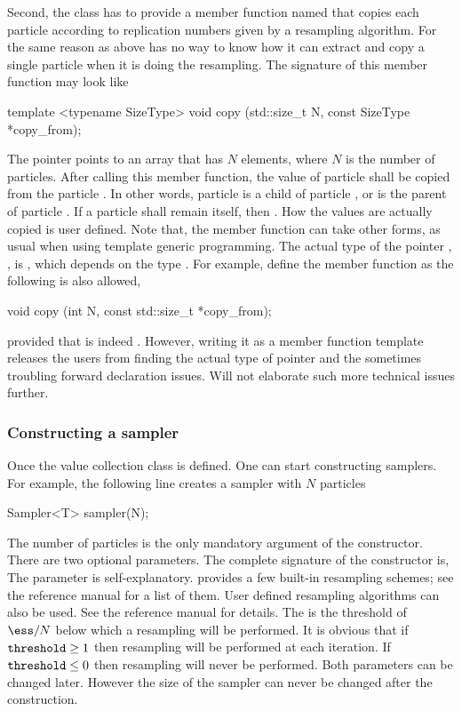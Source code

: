 Second, the class has to provide a member function named  that
copies each particle according to replication numbers given by a resampling
algorithm. For the same reason as above \vsmc has no way to know how it can
extract and copy a single particle when it is doing the resampling. The
signature of this member function may look like
\begin{cppcode}
template <typename SizeType>
void copy (std::size_t N, const SizeType *copy_from);
\end{cppcode}
The pointer  points to an array that has $N$ elements,
where $N$ is the number of particles. After calling this member function, the
value of particle  shall be copied from the particle
. In other words, particle  is a child of
particle , or  is the parent of particle
. If a particle  shall remain itself, then
. How the values are actually copied is user defined.
Note that, the member function can take other forms, as usual when using \cpp
template generic programming.
The actual type of the pointer , , is
, which depends on the type . For
example, define the member function as the following is also allowed,
\begin{cppcode}
void copy (int N, const std::size_t *copy_from);
\end{cppcode}
provided that  is indeed .
However, writing it as a member function template releases the users from
finding the actual type of pointer  and the sometimes
troubling forward declaration issues. Will not elaborate such more technical
issues further.

\subsubsection{Constructing a sampler}
\label{ssub:Constructing a sampler}

Once the value collection class  is defined. One can start
constructing \smc samplers. For example, the following line creates a sampler
with $N$ particles
\begin{cppcode}
Sampler<T> sampler(N);
\end{cppcode}
The number of particles is the only mandatory argument of the constructor.
There are two optional parameters. The complete signature of the constructor
is,
The  parameter is self-explanatory. \vsmc provides a few built-in
resampling schemes; see the reference manual for a list of them. User defined
resampling algorithms can also be used. See the reference manual for details.
The  is the threshold of $\ess/N$ below which a resampling
will be performed. It is obvious that if $\text{\code{threshold}}\ge1$ then
resampling will be performed at each iteration. If
$\text{\code{threshold}}\le0$ then resampling will never be performed. Both
parameters can be changed later. However the size of the sampler can never be
changed after the construction.

